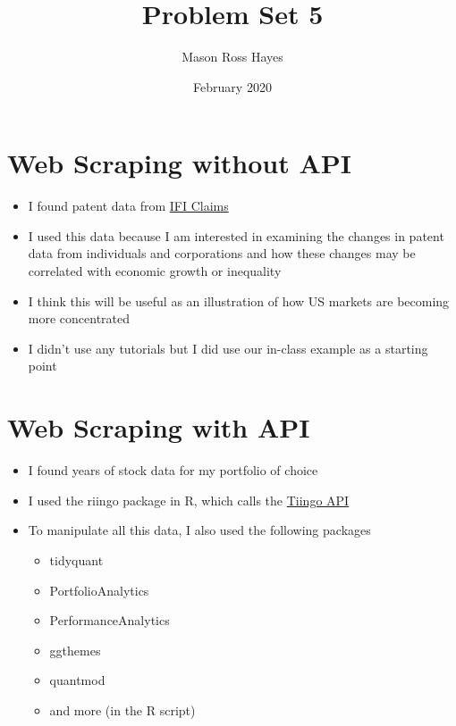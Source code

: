 \documentclass{article}
\title{Problem Set 5}
\author{Mason Ross Hayes}
\date{February 2020}
\begin{document}
\maketitle

\section{Web Scraping without API}

\begin{itemize}
    \item I found patent data from \href{https://www.ificlaims.com/rankings-top-50-2018.htm}{IFI Claims}
    \item I used this data because I am interested in examining the changes in patent data from individuals and corporations and how these changes may be correlated with economic growth or inequality
    \item I think this will be useful as an illustration of how US markets are becoming more concentrated
    \item I didn't use any tutorials but I did use our in-class example as a starting point
\end{itemize}

\section{Web Scraping with API}

\begin{itemize}
    \item I found years of stock data for my portfolio of choice
    \item I used the riingo package in R, which calls the \href{https://api.tiingo.com/documentation/general/overview}{Tiingo API}
    \item To manipulate all this data, I also used the following packages
        \begin{itemize}
            \item tidyquant
            \item PortfolioAnalytics
            \item PerformanceAnalytics
            \item ggthemes
            \item quantmod
            \item and more (in the R script)
        \end{itemize}
\end{itemize}
\end{document}
